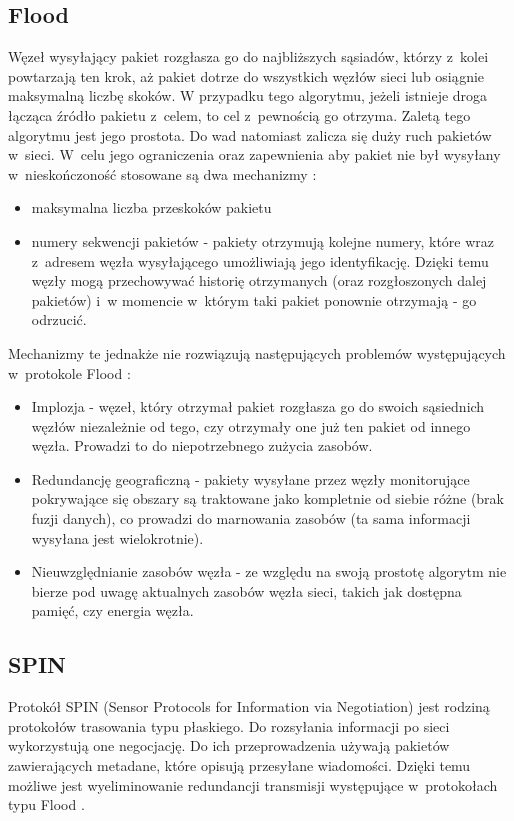 \subsection{Flood}\label{subsec:flood}
Węzeł wysyłający pakiet rozgłasza go do najbliższych sąsiadów, którzy z~kolei powtarzają ten krok, aż pakiet dotrze do wszystkich węzłów sieci lub osiągnie maksymalną liczbę skoków.
W przypadku tego algorytmu, jeżeli istnieje droga łącząca źródło pakietu z~celem, to cel z~pewnością go otrzyma.
Zaletą tego algorytmu jest jego prostota. Do wad natomiast zalicza się duży ruch pakietów w~sieci. W~celu jego ograniczenia oraz zapewnienia aby pakiet nie był wysyłany w~nieskończoność stosowane są dwa mechanizmy \cite{Dargie2010}:
\begin{itemize}
	\item maksymalna liczba przeskoków pakietu
	\item numery sekwencji pakietów - pakiety otrzymują kolejne numery, które wraz z~adresem węzła wysyłającego umożliwiają jego identyfikację. Dzięki temu węzły mogą przechowywać historię otrzymanych (oraz rozgłoszonych dalej pakietów) i~w momencie w~którym taki pakiet ponownie otrzymają - go odrzucić.
\end{itemize}

Mechanizmy te jednakże nie rozwiązują następujących problemów występujących w~protokole Flood \cite{Dargie2010}:
\begin{itemize}
	\item Implozja - węzeł, który otrzymał pakiet rozgłasza go do swoich sąsiednich węzłów niezależnie od tego, czy otrzymały one już ten pakiet od innego węzła. Prowadzi to do niepotrzebnego zużycia zasobów. %
	\item Redundancję geograficzną - pakiety wysyłane przez węzły monitorujące pokrywające się obszary są traktowane jako kompletnie od siebie różne (brak fuzji danych), co prowadzi do marnowania zasobów (ta sama informacji wysyłana jest wielokrotnie). %
	\item Nieuwzględnianie zasobów węzła - ze względu na swoją prostotę algorytm nie bierze pod uwagę aktualnych zasobów węzła sieci, takich jak dostępna pamięć, czy energia węzła.
\end{itemize}
\subsection{SPIN}
Protokół SPIN (Sensor Protocols for Information via Negotiation) jest rodziną protokołów trasowania typu płaskiego. Do rozsyłania informacji po sieci wykorzystują one negocjację. Do ich przeprowadzenia używają pakietów zawierających metadane, które opisują przesyłane wiadomości. Dzięki temu możliwe jest wyeliminowanie redundancji transmisji występujące w~protokołach typu Flood \cite{Chaudhary2015}.

